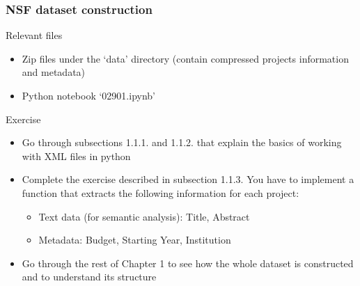 \documentclass{beamer}
\begin{document}
\begin{frame}

    \frametitle{NSF dataset construction}
    
	\begin{block}{Relevant files}
	
		\begin{itemize}
		
			\item Zip files under the `data' directory (contain compressed projects information and metadata)
			
			\item Python notebook `02901.ipynb'
			
		\end{itemize}
	
	\end{block}
	
	\begin{exampleblock}{Exercise}
		
			\begin{itemize}
			
				\item Go through subsections 1.1.1. and 1.1.2. that explain the basics of working with XML files in python
				
				\item Complete the exercise described in subsection 1.1.3. You have to implement a function that extracts the following information for each project:
				
				\begin{itemize}
					\item Text data (for semantic analysis): Title, Abstract
					\item Metadata: Budget, Starting Year, Institution
				\end{itemize}
				
				\item Go through the rest of Chapter 1 to see how the whole dataset is constructed and to understand its structure
				
			\end{itemize}
		
	\end{exampleblock}
	
\end{frame}


\end{document}
